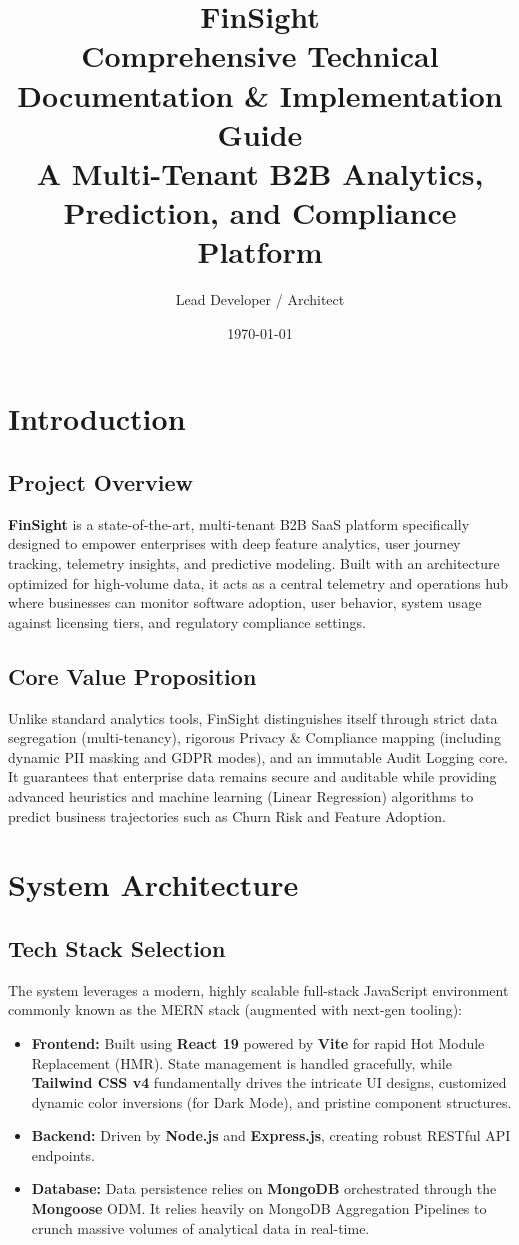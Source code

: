 \documentclass[12pt,a4paper]{report}
\title{
    \vspace{2cm}
    \Huge \textbf{FinSight} \\
    \vspace{1cm}
    \Large \textbf{Comprehensive Technical Documentation \& Implementation Guide} \\
    \vspace{0.5cm}
    \large A Multi-Tenant B2B Analytics, Prediction, and Compliance Platform
}
\author{Lead Developer / Architect}
\date{\today}
\begin{document}
\maketitle

\tableofcontents
\newpage

\chapter{Introduction}
\section{Project Overview}
\textbf{FinSight} is a state-of-the-art, multi-tenant B2B SaaS platform specifically designed to empower enterprises with deep feature analytics, user journey tracking, telemetry insights, and predictive modeling. Built with an architecture optimized for high-volume data, it acts as a central telemetry and operations hub where businesses can monitor software adoption, user behavior, system usage against licensing tiers, and regulatory compliance settings.

\section{Core Value Proposition}
Unlike standard analytics tools, FinSight distinguishes itself through strict data segregation (multi-tenancy), rigorous Privacy \& Compliance mapping (including dynamic PII masking and GDPR modes), and an immutable Audit Logging core. It guarantees that enterprise data remains secure and auditable while providing advanced heuristics and machine learning (Linear Regression) algorithms to predict business trajectories such as Churn Risk and Feature Adoption.

\chapter{System Architecture}
\section{Tech Stack Selection}
The system leverages a modern, highly scalable full-stack JavaScript environment commonly known as the MERN stack (augmented with next-gen tooling):
\begin{itemize}
    \item \textbf{Frontend:} Built using \textbf{React 19} powered by \textbf{Vite} for rapid Hot Module Replacement (HMR). State management is handled gracefully, while \textbf{Tailwind CSS v4} fundamentally drives the intricate UI designs, customized dynamic color inversions (for Dark Mode), and pristine component structures.
    \item \textbf{Backend:} Driven by \textbf{Node.js} and \textbf{Express.js}, creating robust RESTful API endpoints. 
    \item \textbf{Database:} Data persistence relies on \textbf{MongoDB} orchestrated through the \textbf{Mongoose} ODM. It relies heavily on MongoDB Aggregation Pipelines to crunch massive volumes of analytical data in real-time.
\end{itemize}
\end{document}
